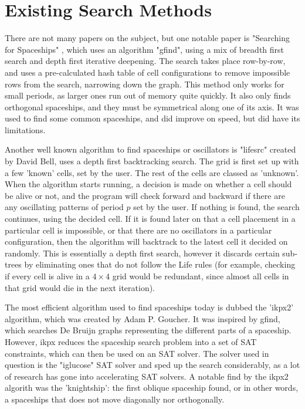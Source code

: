 \documentclass{l4proj}
\begin{document}
\section{Existing Search Methods}

There are not many papers on the subject, but one notable paper is "Searching for Spaceships" \cite{searching_for_spaceships}, which uses an algorithm "gfind", using a mix of breadth first search and depth first iterative deepening. The search takes place row-by-row, and uses a pre-calculated hash table of cell configurations to remove impossible rows from the search, narrowing down the graph. This method only works for small periods, as larger ones run out of memory quite quickly. It also only finds orthogonal spaceships, and they must be symmetrical along one of its axis. It was used to find some common spaceships, and did improve on speed, but did have its limitations.

Another well known algorithm to find spaceships or oscillators is "lifesrc" created by David Bell, uses a depth first backtracking search. The grid is first set up with a few 'known' cells, set by the user. The rest of the cells are classed as 'unknown'. When the algorithm starts running, a decision is made on whether a cell should be alive or not, and the program will check forward and backward if there are any oscillating patterns of period $p$ set by the user. If nothing is found, the search continues, using the decided cell. If it is found later on that a cell placement in a particular cell is impossible, or that there are no oscillators in a particular configuration, then the algorithm will backtrack to the latest cell it decided on randomly. This is essentially a depth first search, however it discards certain sub-trees by eliminating ones that do not follow the Life rules (for example, checking if every cell is alive in a $4 \times 4$ grid would be redundant, since almost all cells in that grid would die in the next iteration). 

The most efficient algorithm used to find spaceships today is dubbed the 'ikpx2' algorithm, which was created by Adam P. Goucher. It was inspired by gfind, which searches De Bruijn graphs representing the different parts of a spaceship. However, ikpx reduces the spaceship search problem into a set of SAT constraints, which can then be used on an SAT solver. The solver used in question is the "iglucose" \cite{sat_2018} SAT solver and sped up the search considerably, as a lot of research has gone into accelerating SAT solvers. A notable find by the ikpx2 algorith was the 'knightship': the first oblique spaceship found, or in other words, a spaceships that does not move diagonally nor orthogonally.
\end{document}
